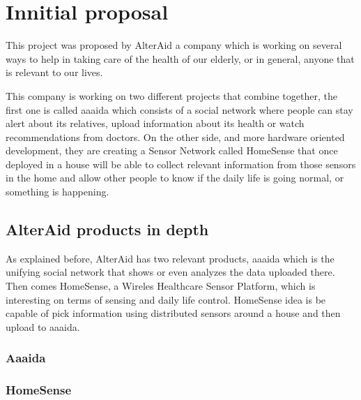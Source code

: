 \chapter{Innitial proposal}\label{C:innitial-proposal}
This project was proposed by AlterAid a company which is working on several ways to help in taking care of the health of our elderly, or in general, anyone that is relevant to our lives.

This company is working on two different projects that combine together, the first one is called aaaida which consists of a social network where people can stay alert about its relatives, upload information about its health or watch recommendations from doctors. On the other side, and more hardware oriented development, they are creating a Sensor Network called HomeSense that once deployed in a house will be able to collect relevant information from those sensors in the home and allow other people to know if the daily life is going normal, or something is happening.


\section{AlterAid products in depth}\label{S:alteraid-products}
As explained before, AlterAid has two relevant products, aaaida which is the unifying social network that shows or even analyzes
the data uploaded there. Then comes HomeSense, a Wireles Healthcare Sensor Platform, which is interesting on terms of sensing and daily life control. HomeSense idea is be capable of pick information using distributed sensors around a house and then upload to aaaida.

\subsection{Aaaida}\label{SS:Aaaida-proposal}


\subsection{HomeSense}\label{SS:HomeSense-proposal}


